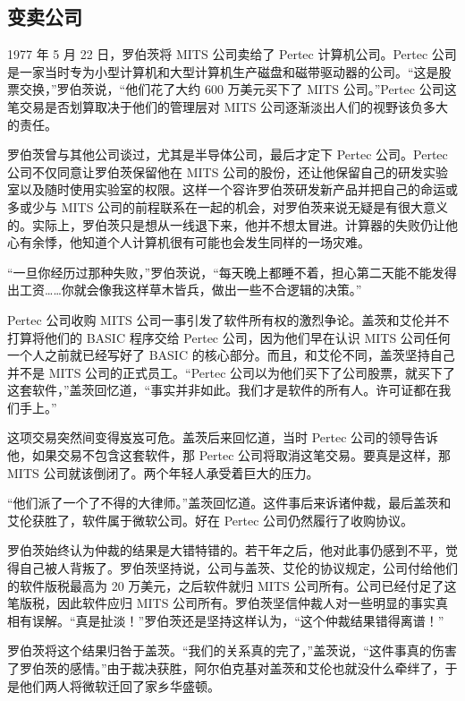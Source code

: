 \documentclass[12pt,UTF8]{ctexbook}
\begin{document}
\subsection{变卖公司}


1977 年 5 月 22 日，罗伯茨将 MITS 公司卖给了 Pertec 计算机公司。Pertec 公司是一家当时专为小型计算机和大型计算机生产磁盘和磁带驱动器的公司。“这是股票交换，”罗伯茨说，“他们花了大约 600 万美元买下了 MITS 公司。”Pertec 公司这笔交易是否划算取决于他们的管理层对 MITS 公司逐渐淡出人们的视野该负多大的责任。

罗伯茨曾与其他公司谈过，尤其是半导体公司，最后才定下 Pertec 公司。Pertec 公司不仅同意让罗伯茨保留他在 MITS 公司的股份，还让他保留自己的研发实验室以及随时使用实验室的权限。这样一个容许罗伯茨研发新产品并把自己的命运或多或少与 MITS 公司的前程联系在一起的机会，对罗伯茨来说无疑是有很大意义的。实际上，罗伯茨只是想从一线退下来，他并不想太冒进。计算器的失败仍让他心有余悸，他知道个人计算机很有可能也会发生同样的一场灾难。

“一旦你经历过那种失败，”罗伯茨说，“每天晚上都睡不着，担心第二天能不能发得出工资……你就会像我这样草木皆兵，做出一些不合逻辑的决策。”

Pertec 公司收购 MITS 公司一事引发了软件所有权的激烈争论。盖茨和艾伦并不打算将他们的 BASIC 程序交给 Pertec 公司，因为他们早在认识 MITS 公司任何一个人之前就已经写好了 BASIC 的核心部分。而且，和艾伦不同，盖茨坚持自己并不是 MITS 公司的正式员工。“Pertec 公司以为他们买下了公司股票，就买下了这套软件，”盖茨回忆道，“事实并非如此。我们才是软件的所有人。许可证都在我们手上。”

这项交易突然间变得岌岌可危。盖茨后来回忆道，当时 Pertec 公司的领导告诉他，如果交易不包含这套软件，那 Pertec 公司将取消这笔交易。要真是这样，那 MITS 公司就该倒闭了。两个年轻人承受着巨大的压力。

“他们派了一个了不得的大律师。”盖茨回忆道。这件事后来诉诸仲裁，最后盖茨和艾伦获胜了，软件属于微软公司。好在 Pertec 公司仍然履行了收购协议。

罗伯茨始终认为仲裁的结果是大错特错的。若干年之后，他对此事仍感到不平，觉得自己被人背叛了。罗伯茨坚持说，公司与盖茨、艾伦的协议规定，公司付给他们的软件版税最高为 20 万美元，之后软件就归 MITS 公司所有。公司已经付足了这笔版税，因此软件应归 MITS 公司所有。罗伯茨坚信仲裁人对一些明显的事实真相有误解。“真是扯淡！”罗伯茨还是坚持这样认为，“这个仲裁结果错得离谱！”

罗伯茨将这个结果归咎于盖茨。“我们的关系真的完了，”盖茨说，“这件事真的伤害了罗伯茨的感情。”由于裁决获胜，阿尔伯克基对盖茨和艾伦也就没什么牵绊了，于是他们两人将微软迁回了家乡华盛顿。
\end{document}
